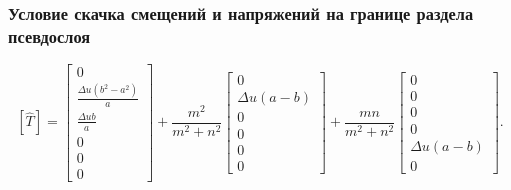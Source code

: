 \begin{frame}
    \frametitle{Условие скачка смещений и напряжений на границе раздела псевдослоя}
    \begin{equation*}
        \left[ \hat{T} \right] = 
        \left[ \begin{array}{c} 
            0 \\ \frac{\Delta u(b^2 - a^2)}{a} \\ \frac{\Delta ub}{a} \\ 0 \\ 0 \\ 0 
        \end{array} \right]
        +
        \frac{m^2}{m^2+n^2} \left[ \begin{array}{c} 
            0 \\ \Delta u(a-b) \\ 0 \\ 0 \\ 0 \\ 0 
        \end{array} \right]
        +
        \frac{mn}{m^2+n^2} \left[ \begin{array}{c} 
            0 \\ 0 \\ 0 \\ 0 \\ \Delta u(a-b) \\ 0 
        \end{array} \right].
    \end{equation*}
\end{frame}


